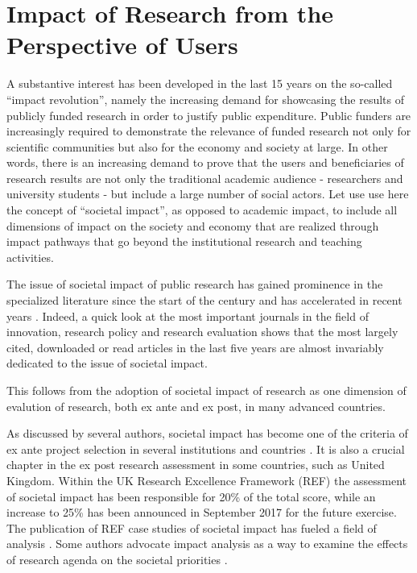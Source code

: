 \documentclass[]{book}
\begin{document}
\chapter{Impact of Research from the Perspective of
Users}\label{impact-of-research-from-the-perspective-of-users}

A substantive interest has been developed in the last 15 years on the
so-called ``impact revolution'', namely the increasing demand for
showcasing the results of publicly funded research in order to justify
public expenditure. Public funders are increasingly required to
demonstrate the relevance of funded research not only for scientific
communities but also for the economy and society at large. In other
words, there is an increasing demand to prove that the users and
beneficiaries of research results are not only the traditional academic
audience - researchers and university students - but include a large
number of social actors. Let use use here the concept of ``societal
impact'', as opposed to academic impact, to include all dimensions of
impact on the society and economy that are realized through impact
pathways that go beyond the institutional research and teaching
activities.

The issue of societal impact of public research has gained prominence in
the specialized literature since the start of the century and has
accelerated in recent years
\citep{van2000evaluation, erno2011measuring, bornmann2013societal, bornmann2014evaluate, bornmann2017does}.
Indeed, a quick look at the most important journals in the field of
innovation, research policy and research evaluation shows that the most
largely cited, downloaded or read articles in the last five years are
almost invariably dedicated to the issue of societal impact.

This follows from the adoption of societal impact of research as one
dimension of evalution of research, both ex ante and ex post, in many
advanced countries.

As discussed by several authors, societal impact has become one of the
criteria of ex ante project selection in several institutions and
countries \citep{kanninen2006methods, dance2013impact}. It is also a
crucial chapter in the ex post research assessment in some countries,
such as United Kingdom. Within the UK Research Excellence Framework
(REF) the assessment of societal impact has been responsible for 20\% of
the total score, while an increase to 25\% has been announced in
September 2017 for the future exercise. The publication of REF case
studies of societal impact has fueled a field of analysis
\citep{derrick2014unwrapping, samuel2015societal, khazragui2014measuring}.
Some authors advocate impact analysis as a way to examine the effects of
research agenda on the societal priorities
\citep{cozzens2002evaluating}.
\end{document}
